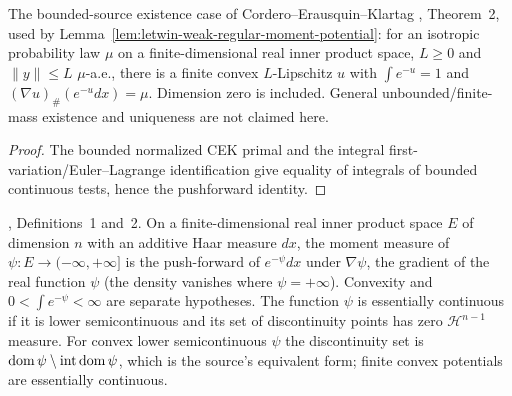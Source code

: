 \begin{lemma}
  \label{lem:cek-bounded-moment-map}
  \leanok
  The bounded-source existence case of Cordero--Erausquin--Klartag
  \cite{CorderoKlartag2015}, Theorem~2, used by Lemma~\ref{lem:letwin-weak-regular-moment-potential}: for an isotropic probability law
  $\mu$ on a finite-dimensional real inner product space, $L\ge0$ and $\|y\|\le L$ $\mu$-a.e.,
  there is a finite convex $L$-Lipschitz $u$ with $\int e^{-u}=1$ and
  $(\nabla u)_\#(e^{-u}dx)=\mu$. Dimension zero is included. General unbounded/finite-mass existence
  and uniqueness are not claimed here.
\end{lemma}
\begin{proof}
  \leanok
  The bounded normalized CEK primal and the integral first-variation/Euler--Lagrange
  identification give equality of integrals of bounded continuous tests, hence the pushforward identity.
\end{proof}

\begin{definition}
  \label{def:cek-moment-measure}
  \leanok
  \cite{CorderoKlartag2015}, Definitions~1 and~2. On a finite-dimensional real inner product space $E$ of dimension $n$
  with an additive Haar measure $dx$, the moment measure of $\psi\colon E\to(-\infty,+\infty]$ is the push-forward of
  $e^{-\psi}dx$ under $\nabla\psi$, the gradient of the real function $\psi$ (the density vanishes where
  $\psi=+\infty$). Convexity and $0<\int e^{-\psi}<\infty$ are separate hypotheses. The function $\psi$ is essentially
  continuous if it is lower semicontinuous and its set of discontinuity points has zero $\mathcal H^{n-1}$ measure. For
  convex lower semicontinuous $\psi$ the discontinuity set is $\operatorname{dom}\psi\setminus\operatorname{int}\operatorname{dom}\psi$, which is the
  source's equivalent form; finite convex potentials are essentially continuous.
\end{definition}

